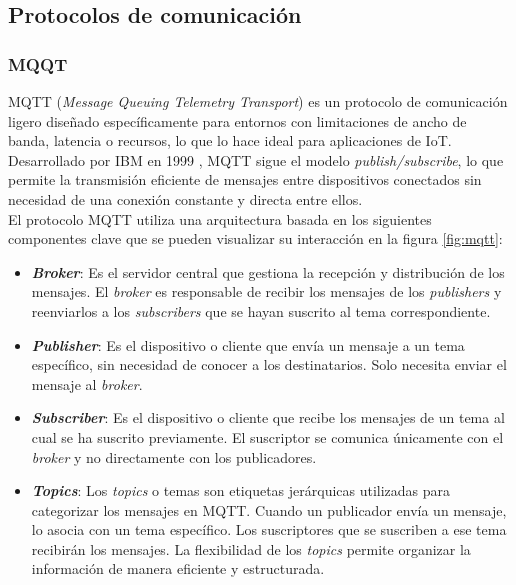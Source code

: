 \subsection{Protocolos de comunicación}
\subsubsection{MQQT}        

MQTT (\textit{Message Queuing Telemetry Transport}) es un protocolo de comunicación ligero diseñado específicamente para entornos con limitaciones de ancho de banda, latencia o recursos, lo que lo hace ideal para aplicaciones de IoT. Desarrollado por IBM en 1999 \cite{mqtt_ibm}, MQTT sigue el modelo \textit{publish/subscribe}, lo que permite la transmisión eficiente de mensajes entre dispositivos conectados sin necesidad de una conexión constante y directa entre ellos. \\


El protocolo MQTT utiliza una arquitectura basada en los siguientes componentes clave que se pueden visualizar su interacción en la figura \ref{fig:mqtt}:

\begin{itemize}
    \item \textbf{\textit{Broker}}: Es el servidor central que gestiona la recepción y distribución de los mensajes. El \textit{broker} es responsable de recibir los mensajes de los \textit{publishers} y reenviarlos a los \textit{subscribers} que se hayan suscrito al tema correspondiente.

    \item \textbf{\textit{Publisher}}: Es el dispositivo o cliente que envía un mensaje a un tema específico, sin necesidad de conocer a los destinatarios. Solo necesita enviar el mensaje al \textit{broker}.

    \item \textbf{\textit{Subscriber}}: Es el dispositivo o cliente que recibe los mensajes de un tema al cual se ha suscrito previamente. El suscriptor se comunica únicamente con el \textit{broker} y no directamente con los publicadores.

    \item  \textbf{\textit{Topics}}: Los \textit{topics} o temas son etiquetas jerárquicas utilizadas para categorizar los mensajes en MQTT. Cuando un publicador envía un mensaje, lo asocia con un tema específico. Los suscriptores que se suscriben a ese tema recibirán los mensajes. La flexibilidad de los \textit{topics} permite organizar la información de manera eficiente y estructurada.
\end{itemize}

